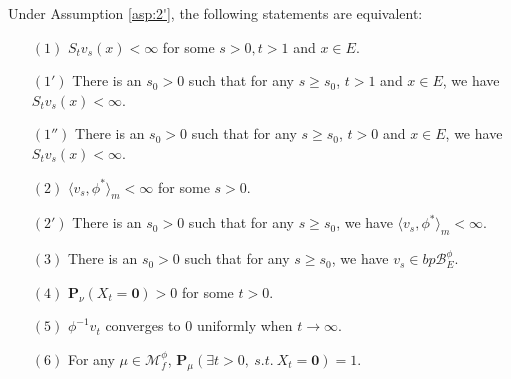 \begin{lem}\label{lem:discuss-of-assumption2'}
	Under Assumption \ref{asp:2'}, the following statements are equivalent:
\begin{enumerate}
\item[$(1)$]
	$S_tv_s(x)<\infty$ for some $s>0,t>1$ and $x\in E$.
\item[$(1')$]
	There is an $s_0>0$ such that for any $s\geq s_0$, $t>1$ and $x\in E$, we have $S_tv_s(x)<\infty$.
\item[$(1'')$]
	There is an $s_0>0$ such that for any $s\geq s_0$, $t>0$ and $x\in E$, we have $S_tv_s(x)<\infty$.
\item[$(2)$]
	$ \langle v_s, \phi^* \rangle_m < \infty$ for some $s>0$.
\item[$(2')$]
	There is an $s_0>0$ such that for any $s\geq s_0$, we have $\langle v_s, \phi^* \rangle_m < \infty$.
\item[$(3)$]
	There is an $s_0>0$ such that for any $s\geq s_0$, we have $v_s\in bp\mathscr B^\phi_E$.
\item[$(4)$]
	$\mathbf P_\nu (X_t = \mathbf 0) > 0$ for some $t>0$.
\item[$(5)$]
	$\phi^{-1}v_t$ converges to $0$ uniformly when $t\to\infty$.
\item[$(6)$]
	For any $\mu \in \mathcal M^\phi_f$, $\mathbf P_\mu(\exists t>0,~s.t.~X_t = \mathbf 0)
	= 1$.
\end{enumerate}
\end{lem}
